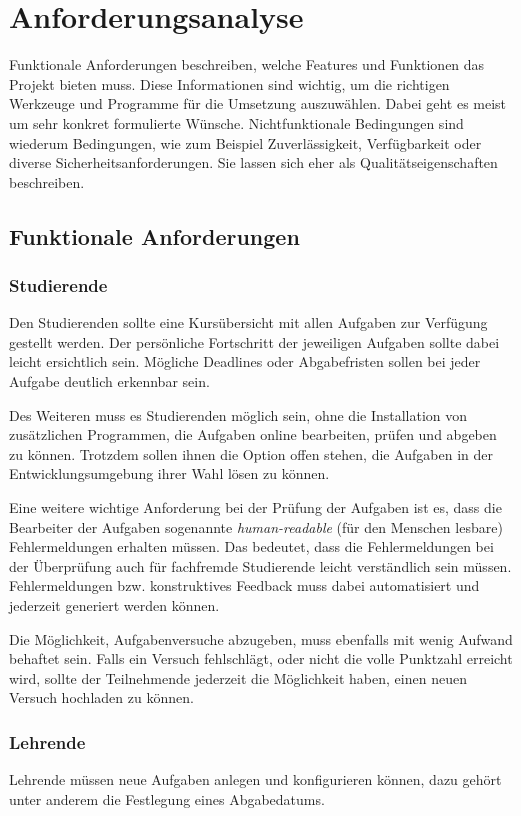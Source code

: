 \section{Anforderungsanalyse}\label{anforderungsanalyse}
Funktionale Anforderungen beschreiben, welche Features und Funktionen das
Projekt bieten muss. Diese Informationen sind wichtig, um die richtigen
Werkzeuge und Programme für die Umsetzung auszuwählen. Dabei geht es meist um
sehr konkret formulierte Wünsche. Nichtfunktionale Bedingungen sind wiederum
Bedingungen, wie zum Beispiel Zuverlässigkeit, Verfügbarkeit oder diverse
Sicherheitsanforderungen. Sie lassen sich eher als Qualitätseigenschaften
beschreiben.

\subsection{Funktionale Anforderungen}\label{anforderungsanalyse-funktional}
\subsubsection{Studierende}\label{anforderungsanalyse-funktional-stud}
Den Studierenden sollte eine Kursübersicht mit allen Aufgaben zur Verfügung
gestellt werden. Der persönliche Fortschritt der jeweiligen Aufgaben sollte
dabei leicht ersichtlich sein. Mögliche Deadlines oder Abgabefristen sollen bei
jeder Aufgabe deutlich erkennbar sein.

Des Weiteren muss es Studierenden möglich sein, ohne die Installation von
zusätzlichen Programmen, die Aufgaben online bearbeiten, prüfen und abgeben zu
können. Trotzdem sollen ihnen die Option offen stehen, die Aufgaben in der
Entwicklungsumgebung ihrer Wahl lösen zu können.

Eine weitere wichtige Anforderung bei der Prüfung der Aufgaben ist es, dass
die Bearbeiter der Aufgaben sogenannte \emph{human-readable} (für den Menschen
lesbare) Fehlermeldungen erhalten müssen. Das bedeutet, dass die Fehlermeldungen
bei der Überprüfung auch für fachfremde Studierende leicht verständlich sein
müssen. Fehlermeldungen bzw. konstruktives Feedback muss dabei automatisiert und
jederzeit generiert werden können.

Die Möglichkeit, Aufgabenversuche abzugeben, muss ebenfalls mit wenig Aufwand
behaftet sein. Falls ein Versuch fehlschlägt, oder nicht die volle Punktzahl
erreicht wird, sollte der Teilnehmende jederzeit die Möglichkeit haben, einen
neuen Versuch hochladen zu können.

\subsubsection{Lehrende}\label{anforderungsanalyse-funktional-lehrende}
Lehrende müssen neue Aufgaben anlegen und konfigurieren können, dazu gehört
unter anderem die Festlegung eines Abgabedatums.

